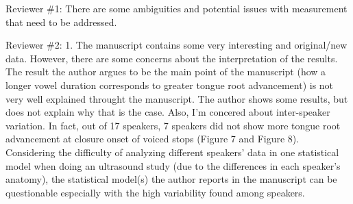 \documentclass[]{article}
\begin{document}
Reviewer \#1: There are some ambiguities and potential issues with
measurement that need to be addressed.

Reviewer \#2: 1. The manuscript contains some very interesting and
original/new data. However, there are some concerns about the
interpretation of the results. The result the author argues to be the
main point of the manuscript (how a longer vowel duration corresponds to
greater tongue root advancement) is not very well explained throught the
manuscript. The author shows some results, but does not explain why that
is the case. Also, I'm concered about inter-speaker variation. In fact,
out of 17 speakers, 7 speakers did not show more tongue root advancement
at closure onset of voiced stops (Figure 7 and Figure 8). Considering
the difficulty of analyzing different speakers' data in one statistical
model when doing an ultrasound study (due to the differences in each
speaker's anatomy), the statistical model(s) the author reports in the
manuscript can be questionable especially with the high variability
found among speakers.
\end{document}

